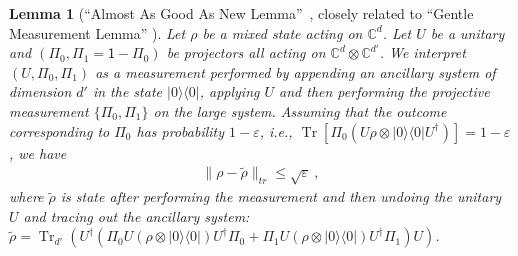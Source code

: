 \documentclass[11pt]{report}
\theoremstyle{plain}
\newtheorem{lemma}[theorem]{Lemma}
\theoremstyle{definition}
\newcommand{\C}{{\mathbb C}}
\newcommand{\eps}{\varepsilon}
\newcommand{\ketbra}[2]{|#1\rangle\!\langle#2|}
\newcommand{\proj}[1]{\ketbra{#1}{#1}}
\newcommand{\Tr}{\operatorname{Tr}}
\begin{document}
\begin{lemma}[``Almost As Good As New Lemma''~\cite{aar:adv}, closely related to ``Gentle Measurement Lemma'' \cite{gentle}]
\label{lem:aagan}
Let $\rho$ be a mixed state acting on $\C^d$. Let $U$ be a unitary and $(\Pi_0, \Pi_1 = \mathsf{1} - \Pi_0)$ be projectors all acting on $\C^{d} \otimes \C^{d'}$. We interpret $(U, \Pi_0, \Pi_1)$ as a measurement performed by appending an ancillary system of dimension $d'$ in the state $\proj{0}$, applying $U$ and then performing the projective measurement $\{ \Pi_0, \Pi_1\}$ on the large system. Assuming that the outcome corresponding to $\Pi_0$ has probability $1-\eps$, i.e., $\Tr[ \Pi_0 (U \rho \otimes \proj{0} U^{\dagger}) ] = 1 - \eps$, we have
\begin{align*}
\| \rho - \tilde{\rho} \|_{tr} \leq \sqrt{\eps} \ ,
\end{align*}
where $\tilde{\rho}$ is state after performing the measurement and then undoing the unitary $U$ and tracing out the ancillary system: $\tilde{\rho} =  \Tr_{d'}\left(U^{\dagger} \left( \Pi_0 U (\rho \otimes \proj{0}) U^{\dagger} \Pi_0  +  \Pi_1 U (\rho \otimes \proj{0}) U^{\dagger} \Pi_1 \right) U \right)$.
\end{lemma}
\end{document}
